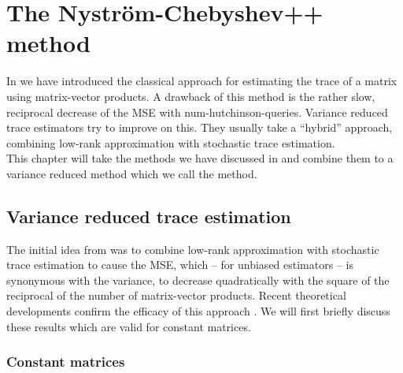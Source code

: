 \chapter{The Nystr\"om-Chebyshev++ method}
\label{chp:4-nystromchebyshev}

In  we have introduced the
classical approach for estimating the trace of a matrix using matrix-vector
products. A drawback of this method is the rather slow, reciprocal decrease of
the \gls{MSE} with \gls{num-hutchinson-queries}. Variance reduced trace estimators
try to improve on this. They usually take a \enquote{hybrid} approach, combining
low-rank approximation with stochastic trace estimation.\\

This chapter will take the methods we have discussed in 
and  combine them to a variance reduced method which
we call the  method.


\section{Variance reduced trace estimation}
\label{sec:4-nystromchebyshev-hybrid}

The initial idea from \cite{lin2017randomized} was to combine low-rank approximation
with stochastic trace estimation to cause the \gls{MSE}, which -- for unbiased estimators
-- is synonymous with the variance, to decrease quadratically with the square
of the reciprocal of the number of matrix-vector products.
Recent theoretical developments confirm the
efficacy of this approach \cite{meyer2021hutch,persson2022hutch}.
We will first briefly discuss these results which are valid 
for constant matrices.\\

\subsection{Constant matrices}
\label{subsec:4-nystromchebyshev-reduction-constant-matrices}

